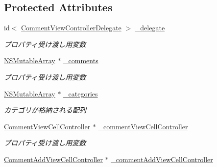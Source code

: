 \subsection*{Protected Attributes}
\begin{DoxyCompactItemize}
\item 
\hypertarget{interface_comment_view_controller_a15a1833571f37c048e5036412e1c266b}{
id$<$ \hyperlink{protocol_comment_view_controller_delegate-p}{CommentViewControllerDelegate} $>$ \hyperlink{interface_comment_view_controller_a15a1833571f37c048e5036412e1c266b}{\_\-delegate}}
\label{interface_comment_view_controller_a15a1833571f37c048e5036412e1c266b}

\begin{DoxyCompactList}\small\item\em プロパティ受け渡し用変数 \end{DoxyCompactList}\item 
\hypertarget{interface_comment_view_controller_a089c48a1b038414e6a3e026a66d89ff9}{
\hyperlink{class_n_s_mutable_array}{NSMutableArray} $\ast$ \hyperlink{interface_comment_view_controller_a089c48a1b038414e6a3e026a66d89ff9}{\_\-comments}}
\label{interface_comment_view_controller_a089c48a1b038414e6a3e026a66d89ff9}

\begin{DoxyCompactList}\small\item\em プロパティ受け渡し用変数 \end{DoxyCompactList}\item 
\hypertarget{interface_comment_view_controller_ae015de3f7d5621a850f5a5e98db340cf}{
\hyperlink{class_n_s_mutable_array}{NSMutableArray} $\ast$ \hyperlink{interface_comment_view_controller_ae015de3f7d5621a850f5a5e98db340cf}{\_\-categories}}
\label{interface_comment_view_controller_ae015de3f7d5621a850f5a5e98db340cf}

\begin{DoxyCompactList}\small\item\em カテゴリが格納される配列 \end{DoxyCompactList}\item 
\hypertarget{interface_comment_view_controller_a780778134ccbb349f003768c124dc224}{
\hyperlink{interface_comment_view_cell_controller}{CommentViewCellController} $\ast$ \hyperlink{interface_comment_view_controller_a780778134ccbb349f003768c124dc224}{\_\-commentViewCellController}}
\label{interface_comment_view_controller_a780778134ccbb349f003768c124dc224}

\begin{DoxyCompactList}\small\item\em プロパティ受け渡し用変数 \end{DoxyCompactList}\item 
\hypertarget{interface_comment_view_controller_a5ebe1c00734de55572d5c6b65acd937d}{
\hyperlink{interface_comment_add_view_cell_controller}{CommentAddViewCellController} $\ast$ \hyperlink{interface_comment_view_controller_a5ebe1c00734de55572d5c6b65acd937d}{\_\-commentAddViewCellController}}
\label{interface_comment_view_controller_a5ebe1c00734de55572d5c6b65acd937d}


\end{DoxyCompactItemize}
